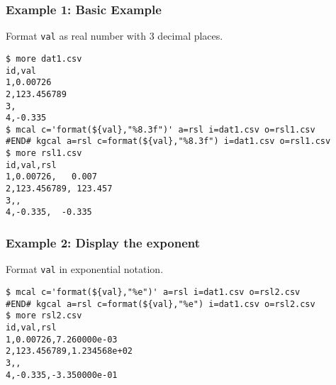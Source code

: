 \subsubsection*{Example 1: Basic Example}

Format \verb|val| as real number with 3 decimal places.


\begin{Verbatim}[baselinestretch=0.7,frame=single]
$ more dat1.csv
id,val
1,0.00726
2,123.456789
3,
4,-0.335
$ mcal c='format(${val},"%8.3f")' a=rsl i=dat1.csv o=rsl1.csv
#END# kgcal a=rsl c=format(${val},"%8.3f") i=dat1.csv o=rsl1.csv
$ more rsl1.csv
id,val,rsl
1,0.00726,   0.007
2,123.456789, 123.457
3,,
4,-0.335,  -0.335
\end{Verbatim}
\subsubsection*{Example 2: Display the exponent}

Format \verb|val| in exponential notation.


\begin{Verbatim}[baselinestretch=0.7,frame=single]
$ mcal c='format(${val},"%e")' a=rsl i=dat1.csv o=rsl2.csv
#END# kgcal a=rsl c=format(${val},"%e") i=dat1.csv o=rsl2.csv
$ more rsl2.csv
id,val,rsl
1,0.00726,7.260000e-03
2,123.456789,1.234568e+02
3,,
4,-0.335,-3.350000e-01
\end{Verbatim}
